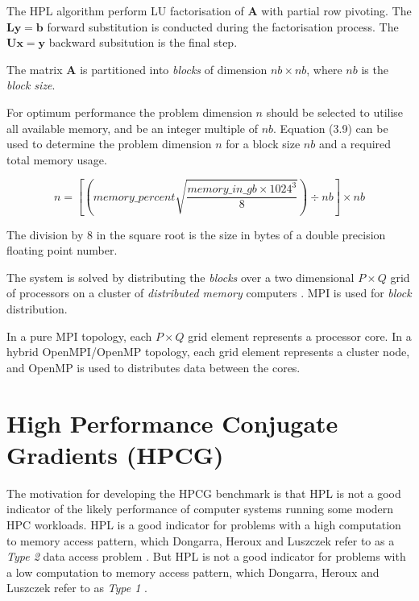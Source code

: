 The HPL algorithm \cite{hpl-algorithm} perform LU factorisation of $\mathbf{A}$ with partial row pivoting. The $\mathbf{L}\mathbf{y}=\mathbf{b}$ forward substitution is conducted during the factorisation process. The $\mathbf{U}\mathbf{x}=\mathbf{y}$ backward subsitution is the final step. 

The matrix $\mathbf{A}$ is partitioned into \emph{blocks} of dimension $nb \times nb$, where $nb$ is the \emph{block size}.

For optimum performance the problem dimension $n$ should be selected to utilise all available memory, and be an integer multiple of $nb$. Equation (3.9) can be used to determine the problem dimension $n$ for a block size $nb$ and a required total memory usage.

\begin{equation}
n = \left[\left(memory\_percent \sqrt{\frac{memory\_in\_gb \times 1024^3}{8}}\right) \div nb\right] \times nb
\end{equation}

The division by 8 in the square root is the size in bytes of a double precision floating point number.

The system is solved by distributing the \emph{blocks} over a two dimensional $P \times Q$ grid of processors on a cluster of \emph{distributed memory} computers \cite{linpack-ppf}. MPI is used for \emph{block} distribution.

In a pure MPI topology, each $P \times Q$ grid element represents a processor core. In a hybrid OpenMPI/OpenMP topology, each grid element represents a cluster node, and OpenMP is used to distributes data between the cores.   





%
%
\section{High Performance Conjugate Gradients (HPCG)}

The motivation for developing the HPCG benchmark \cite{hpcg-benchmark} is that HPL is not a good indicator of the likely performance of computer systems running some modern HPC workloads. HPL is a good indicator for problems with a high computation to memory access pattern, which Dongarra, Heroux and Luszczek refer to as a \emph{Type 2} data access problem \cite{hpcg-benchmark}. But HPL is not a good indicator for problems with a low computation to memory access pattern, which Dongarra, Heroux and Luszczek refer to as \emph{Type 1} \cite{hpcg-benchmark}.

